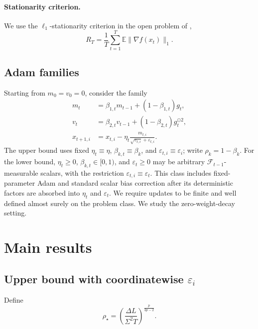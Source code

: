 \documentclass[11pt,letterpaper]{article}
\theoremstyle{definition}
\newcommand{\E}{\mathbb E}
\newcommand{\F}{\mathcal F}
\newcommand{\eps}{\varepsilon}
\newcommand{\grad}{\nabla}
\begin{document}
\paragraph{Stationarity criterion.}
We use the $\ell_1$-stationarity criterion in the open problem of \citet{yu2026openproblem},
\begin{equation}
R_T=\frac1T\sum_{t=1}^T\E\|\grad f(x_t)\|_1.
\label{eq:stationarity}
\end{equation}

\subsection{Adam families}

Starting from $m_0=v_0=0$, consider the family
\begin{align}
m_t&=\beta_{1,t}m_{t-1}+(1-\beta_{1,t})g_t,\\
v_t&=\beta_{2,t}v_{t-1}+(1-\beta_{2,t})g_t^{\odot2},\\
x_{t+1,i}&=x_{t,i}-\eta_t
\frac{m_{t,i}}{\sqrt{v_{t,i}}+\eps_{t,i}}.
\label{eq:adam-family}
\end{align}
The upper bound uses fixed $\eta_t\equiv\eta$,
$\beta_{k,t}\equiv\beta_k$, and $\eps_{t,i}\equiv\eps_i$;
write $\rho_k=1-\beta_k$.
For the lower bound, $\eta_t\ge0$, $\beta_{k,t}\in[0,1)$, and
$\eps_t\ge0$ may be arbitrary $\F_{t-1}$-measurable scalars, with the
restriction $\eps_{t,i}\equiv\eps_t$. This class includes
fixed-parameter Adam and standard scalar bias correction after its
deterministic factors are absorbed into $\eta_t$ and $\eps_t$.
We require updates to be finite and well defined almost surely on the problem class. We study the zero-weight-decay setting.

\section{Main results}
\label{sec:results}

\subsection{Upper bound with coordinatewise \texorpdfstring{$\eps_i$}{epsilon}}

Define
\begin{equation}
\rho_\star=
\left(\frac{\Delta L}{\Sigma^2T}\right)^{\frac{p}{3p-2}}.
\label{eq:target-scale}
\end{equation}
\end{document}
